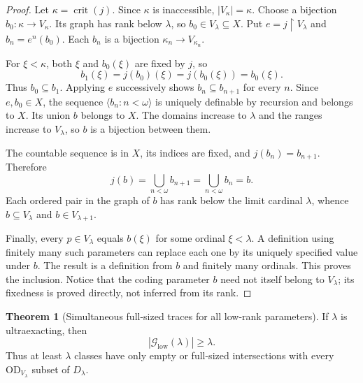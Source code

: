 \documentclass[11pt,letterpaper]{article}
\theoremstyle{definition}
\newtheorem{theorem}[definition]{Theorem}
\newcommand{\OD}{\mathrm{OD}}
\newcommand{\crit}{\operatorname{crit}}
\newcommand{\restr}{\mathbin{\upharpoonright}}
\numberwithin{equation}{section}
\newcommand{\Good}{\mathcal G}
\begin{document}
\begin{proof}
Let $\kappa=\crit(j)$. Since $\kappa$ is inaccessible,
$|V_\kappa|=\kappa$. Choose a bijection $b_0:\kappa\to V_\kappa$.
Its graph has rank below $\lambda$, so $b_0\in V_\lambda\subseteq X$.
Put $e=j\restr V_\lambda$ and $b_n=e^n(b_0)$. Each $b_n$ is a bijection
$\kappa_n\to V_{\kappa_n}$.

For $\xi<\kappa$, both $\xi$ and $b_0(\xi)$ are fixed by $j$, so
\[
             b_1(\xi)=j(b_0)(\xi)=j(b_0(\xi))=b_0(\xi).
\]
Thus $b_0\subseteq b_1$. Applying $e$ successively shows
$b_n\subseteq b_{n+1}$ for every $n$. Since $e,b_0\in X$, the sequence
$\langle b_n:n<\omega\rangle$ is uniquely definable by recursion and belongs
to $X$. Its union $b$ belongs to $X$. The domains increase to $\lambda$ and
the ranges increase to $V_\lambda$, so $b$ is a bijection between them.

The countable sequence is in $X$, its indices are fixed, and
$j(b_n)=b_{n+1}$. Therefore
\[
                  j(b)=\bigcup_{n<\omega}b_{n+1}
                      =\bigcup_{n<\omega}b_n=b.
\]
Each ordered pair in the graph of $b$ has rank below the limit cardinal
$\lambda$, whence $b\subseteq V_\lambda$ and $b\in V_{\lambda+1}$.

Finally, every $p\in V_\lambda$ equals $b(\xi)$ for some ordinal
$\xi<\lambda$. A definition using finitely many such parameters can replace
each one by its uniquely specified value under $b$. The result is a
definition from $b$ and finitely many ordinals. This proves the inclusion.
Notice that the coding parameter $b$ need not itself belong to $V_\lambda$;
its fixedness is proved directly, not inferred from its rank.
\end{proof}

\begin{theorem}[Simultaneous full-sized traces for all low-rank parameters]\label{thm:main}
If $\lambda$ is ultraexacting, then
\[
                         |\Good_{\mathrm{low}}(\lambda)|\ge\lambda.
\]
Thus at least $\lambda$ classes have only empty or full-sized intersections
with every $\OD_{V_\lambda}$ subset of $D_\lambda$.
\end{theorem}
\end{document}

